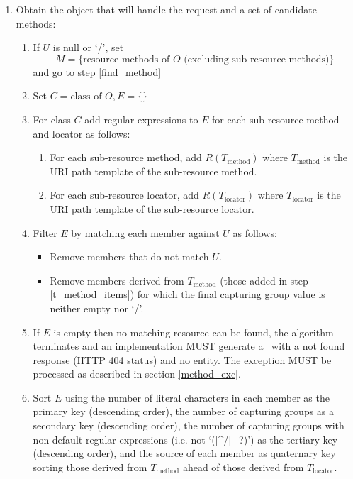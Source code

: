 \begin{enumerate}
\begin{enumerate}
\end{enumerate}

\item \label{find_object} Obtain the object that will handle the request and a set of candidate methods:

\begin{enumerate}
\item \label{check_null} If $U$ is null or \lq/\rq, set
$$M = \{\mbox{resource methods of } O \mbox{ (excluding sub resource methods)}\}$$
and go to step \ref{find_method}

\item Set $C=\mbox{class of } O, E=\{\}$

\item For class $C$ add regular expressions to $E$ for each sub-resource method and locator as follows:
\begin{enumerate}
\item \label{t_method_items} For each sub-resource method, add $R(T_{\mbox{method}})$ where $T_{\mbox{method}}$ is the URI path template of the sub-resource method.
\item For each sub-resource locator, add $R(T_{\mbox{locator}})$ where $T_{\mbox{locator}}$ is the  URI path template of the sub-resource locator.
\end{enumerate}

\item Filter $E$ by matching each member against $U$ as follows:
\begin{itemize}
\item Remove members that do not match $U$.
\item Remove members derived from $T_{\mbox{method}}$ (those added in step \ref{t_method_items}) for which the final capturing group value is neither empty nor \lq/\rq.
\end{itemize}

\item If $E$ is empty then no matching resource can be found, the algorithm terminates and an implementation MUST generate a \WebAppExc\ with a not found response (HTTP 404 status) and no entity. The exception MUST be processed as described in section \ref{method_exc}.

\item Sort $E$ using the number of literal characters in each member as the primary key (descending order), the number of capturing groups as a secondary key (descending order), the number of capturing groups with non-default regular expressions (i.e. not \lq([\^{ }/]+?)\rq) as the tertiary key (descending order), and the source of each member as quaternary key sorting those derived from $T_{\mbox{method}}$ ahead of those derived from $T_{\mbox{locator}}$.


\end{enumerate}
\end{enumerate}

